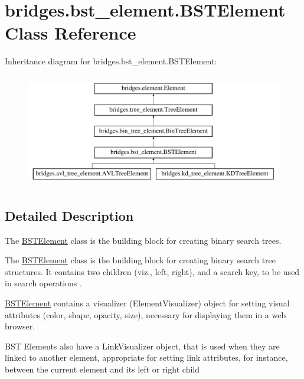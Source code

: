 \hypertarget{classbridges_1_1bst__element_1_1_b_s_t_element}{}\section{bridges.\+bst\+\_\+element.\+B\+S\+T\+Element Class Reference}
\label{classbridges_1_1bst__element_1_1_b_s_t_element}
Inheritance diagram for bridges.\+bst\+\_\+element.\+B\+S\+T\+Element\+:\begin{figure}[H]
\begin{center}
\leavevmode
\includegraphics[height=5.000000cm]{classbridges_1_1bst__element_1_1_b_s_t_element}
\end{center}
\end{figure}


\subsection{Detailed Description}
The \mbox{\hyperlink{classbridges_1_1bst__element_1_1_b_s_t_element}{B\+S\+T\+Element}} class is the building block for creating binary search trees. 

The \mbox{\hyperlink{classbridges_1_1bst__element_1_1_b_s_t_element}{B\+S\+T\+Element}} class is the building block for creating binary search tree structures. It contains two children (viz., left, right), and a search key, to be used in search operations .

\mbox{\hyperlink{classbridges_1_1bst__element_1_1_b_s_t_element}{B\+S\+T\+Element}} contains a visualizer (Element\+Visualizer) object for setting visual attributes (color, shape, opacity, size), necessary for displaying them in a web browser.

B\+ST Elements also have a Link\+Visualizer object, that is used when they are linked to another element, appropriate for setting link attributes, for instance, between the current element and its left or right child


